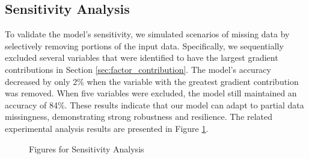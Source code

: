 \subsection{Sensitivity Analysis}
To validate the model’s sensitivity, we simulated scenarios of missing data by selectively removing portions of the input data. Specifically, we sequentially excluded several variables that were identified to have the largest gradient contributions in Section \ref{sec:factor_contribution}. The model’s accuracy decreased by only 2\% when the variable with the greatest gradient contribution was removed. When five variables were excluded, the model still maintained an accuracy of 84\%. These results indicate that our model can adapt to partial data missingness, demonstrating strong robustness and resilience. The related experimental analysis results are presented in Figure \ref{fig:sensitivity_analysis}.


\begin{figure}[htbp]
  \centering
  \hspace{1cm}
  \caption{Figures for Sensitivity Analysis}
  \label{fig:sensitivity_analysis}
\end{figure}